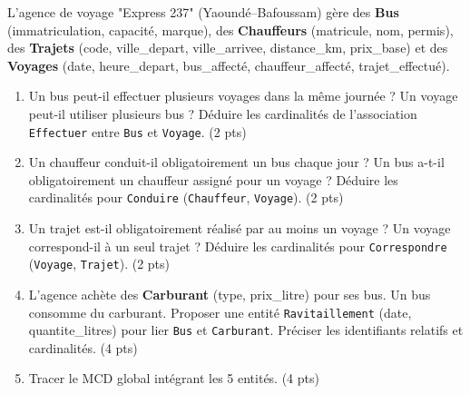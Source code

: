 \documentclass[11pt]{article}
\begin{document}
\begin{exercice}
L'agence de voyage "Express 237" (Yaoundé--Bafoussam) gère des \textbf{Bus} (immatriculation, capacité, marque), des \textbf{Chauffeurs} (matricule, nom, permis), des \textbf{Trajets} (code, ville\_depart, ville\_arrivee, distance\_km, prix\_base) et des \textbf{Voyages} (date, heure\_depart, bus\_affecté, chauffeur\_affecté, trajet\_effectué).
\begin{enumerate}
    \item Un bus peut-il effectuer plusieurs voyages dans la même journée ? Un voyage peut-il utiliser plusieurs bus ? Déduire les cardinalités de l'association \texttt{Effectuer} entre \texttt{Bus} et \texttt{Voyage}. (2 pts)
    \item Un chauffeur conduit-il obligatoirement un bus chaque jour ? Un bus a-t-il obligatoirement un chauffeur assigné pour un voyage ? Déduire les cardinalités pour \texttt{Conduire} (\texttt{Chauffeur}, \texttt{Voyage}). (2 pts)
    \item Un trajet est-il obligatoirement réalisé par au moins un voyage ? Un voyage correspond-il à un seul trajet ? Déduire les cardinalités pour \texttt{Correspondre} (\texttt{Voyage}, \texttt{Trajet}). (2 pts)
    \item L'agence achète des \textbf{Carburant} (type, prix\_litre) pour ses bus. Un bus consomme du carburant. Proposer une entité \texttt{Ravitaillement} (date, quantite\_litres) pour lier \texttt{Bus} et \texttt{Carburant}. Préciser les identifiants relatifs et cardinalités. (4 pts)
    \item Tracer le MCD global intégrant les 5 entités. (4 pts)
\end{enumerate}
\end{exercice}
\end{document}
